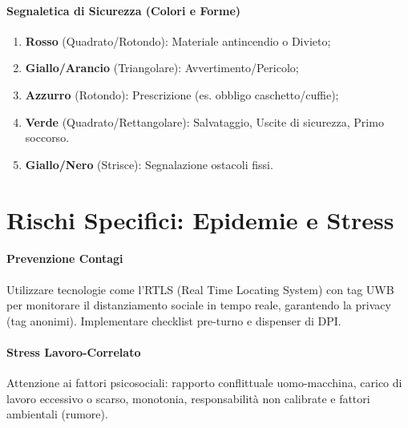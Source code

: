 %
\paragraph{Segnaletica di Sicurezza (Colori e Forme)}
\begin{enumerate}
    \item \textbf{Rosso} (Quadrato/Rotondo): Materiale antincendio o Divieto;
    \item \textbf{Giallo/Arancio} (Triangolare): Avvertimento/Pericolo;
    \item \textbf{Azzurro} (Rotondo): Prescrizione (es. obbligo caschetto/cuffie);
    \item \textbf{Verde} (Quadrato/Rettangolare): Salvataggio, Uscite di sicurezza, Primo soccorso.
    \item \textbf{Giallo/Nero} (Strisce): Segnalazione ostacoli fissi.
\end{enumerate}

%
\section{Rischi Specifici: Epidemie e Stress}
%
\paragraph{Prevenzione Contagi} Utilizzare tecnologie come l'RTLS (Real Time Locating System) con tag UWB per monitorare il distanziamento sociale in tempo reale, garantendo la privacy (tag anonimi). Implementare checklist pre-turno e dispenser di DPI.
%
\paragraph{Stress Lavoro-Correlato} Attenzione ai fattori psicosociali: rapporto conflittuale uomo-macchina, carico di lavoro eccessivo o scarso, monotonia, responsabilità non calibrate e fattori ambientali (rumore).